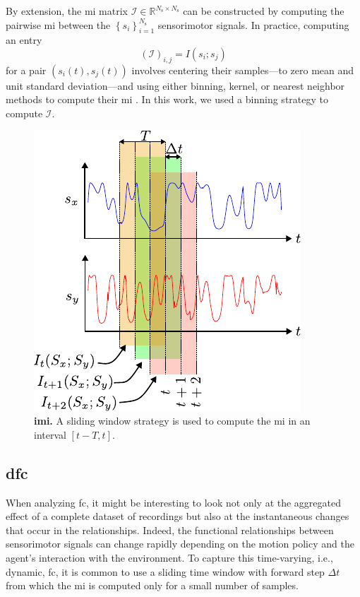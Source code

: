By extension, the \ac{mi} matrix $\bm{\mathcal{I}} \in \mathbb{R}^{{N_\text{s}} \times {N_\text{s}}}$ can be constructed by computing the pairwise \ac{mi} between the $\left\lbrace s_i\right\rbrace^{N_\text{s}}_{i=1}$ sensorimotor signals. In practice, computing an entry
\begin{equation}\label{eq:adjacency_mi}
	\left(\bm{\mathcal{I}}\right)_{i,j} = I(s_i;s_j)
\end{equation}
for a pair $\left({s}_i(t),{s}_j(t)\right)$ involves centering their samples---to zero mean and unit standard deviation---and using either binning, kernel, or nearest neighbor methods to compute their \ac{mi} \cite{WaltersWilliams2009Estimationmutualinformation}. In this work, we used a binning strategy to compute $\bm{\mathcal{I}}$. 

\begin{figure}[!t]
	\begin{center}
		\hspace*{\fill}
		\includegraphics[width=0.7\columnwidth]{sliding_window_mi.pdf}
		\hspace*{\fill}
	\end{center}
	\caption{\label{fig:mi_sliding_window_mi} \textbf{\Acl{imi}.} A sliding window strategy is used to compute the \ac{mi} in an interval $\left[t-T,t\right]$.}
\end{figure}
\subsection{\Acl{dfc}}
When analyzing \ac{fc}, it might be interesting to look not only at the aggregated effect of a complete dataset of recordings but also at the instantaneous changes that occur in the relationships. Indeed, the functional relationships between sensorimotor signals can change rapidly depending on the motion policy and the agent's interaction with the environment. To capture this time-varying, i.e., dynamic, \acl{fc}, it is common to use a sliding time window \cite{Preti2017dynamicfunctionalconnectome} with forward step $\Delta t$ from which the \ac{mi} is computed only for a small number of samples.

